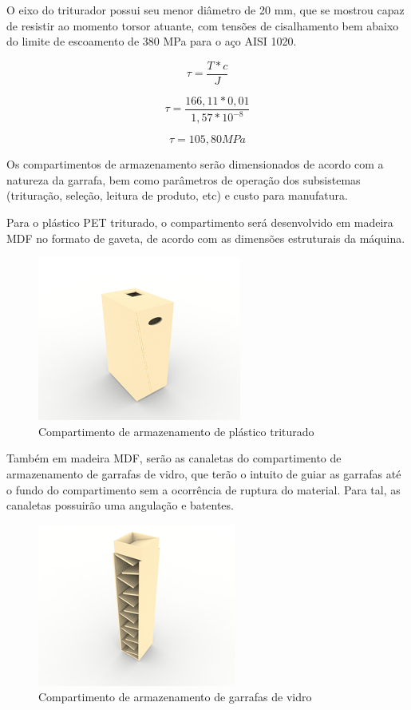O eixo do triturador possui seu menor diâmetro de 20 mm, que se mostrou capaz de resistir ao momento torsor atuante, com tensões de cisalhamento bem abaixo do limite de escoamento de 380 MPa para o aço AISI 1020.

\begin{equation}
    \tau = \frac{T \ast c}{J}
\end{equation}

\begin{equation}
    \tau = \frac{166,11 \ast 0,01}{1,57 \ast 10^{-8}}
\end{equation}

\begin{equation}
    \tau = 105,80 MPa
\end{equation}

Os compartimentos de armazenamento serão dimensionados de acordo com a natureza da garrafa, bem como parâmetros de operação dos subsistemas (trituração, seleção, leitura de produto, etc) e custo para manufatura.

Para o plástico PET triturado, o compartimento será desenvolvido em madeira MDF no formato de gaveta, de acordo com as dimensões estruturais da máquina.


\begin{figure}[!h]
	\centering
		\includegraphics[scale=1.2]{figuras/estrutura/22.png}
	\caption{Compartimento de armazenamento de plástico triturado}
\end{figure}

Também em madeira MDF, serão as canaletas do compartimento de armazenamento de garrafas de vidro, que terão o intuito de guiar as garrafas até o fundo do compartimento sem a ocorrência de ruptura do material. Para tal, as canaletas possuirão uma angulação e batentes. 

\begin{figure}[!h]
	\centering
		\includegraphics[scale=1.2]{figuras/estrutura/23.png}
	\caption{Compartimento de armazenamento de garrafas de vidro}
\end{figure}

